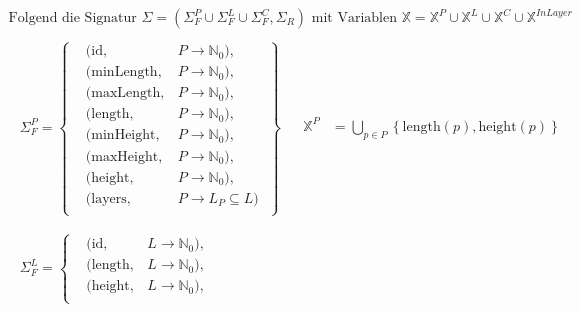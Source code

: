 \[
    \begin{aligned}
        \text{Folgend die Signatur } \Sigma = \left( \Sigma_{F}^{P} \cup \Sigma_{F}^{L} \cup \Sigma_{F}^{C}, \Sigma_{R} \right) \text{ mit Variablen } \mathbb{X} = \mathbb{X}^{P} \cup \mathbb{X}^{L} \cup \mathbb{X}^{C} \cup \mathbb{X}^{InLayer}  \\[5pt]
            \begin{array}{ll}
                \begin{aligned}
                    \Sigma_{F}^{P} = \left\{
                    \begin{aligned}
                        & (\text{id}, & P \rightarrow \mathbb{N}_0), \\
                        & (\text{minLength}, & P \rightarrow \mathbb{N}_0), \\
                        & (\text{maxLength}, & P \rightarrow \mathbb{N}_0), \\
                        & (\text{length}, & P \rightarrow \mathbb{N}_0), \\
                        & (\text{minHeight}, & P \rightarrow \mathbb{N}_0), \\
                        & (\text{maxHeight}, & P \rightarrow \mathbb{N}_0), \\
                        & (\text{height}, & P \rightarrow \mathbb{N}_0), \\
                        & (\text{layers}, & P \rightarrow L_P \subseteq L)\; \\
                    \end{aligned} \right\} \\[5pt]
                \end{aligned}
                &
                \begin{aligned}
                    \mathbb{X}^{P} &= \bigcup_{p \in P} \left\{\text{length}(p), \text{height}(p) \right\} \\
                \end{aligned}
                \\
                \begin{aligned}
                    \Sigma_{F}^{L} = \left\{
                    \begin{aligned}
                        & (\text{id}, & L \rightarrow \mathbb{N}_0), \\
                        & (\text{length}, & L \rightarrow \mathbb{N}_0), \\
                        & (\text{height}, & L \rightarrow \mathbb{N}_0), \\

\end{aligned}
\end{aligned}
\end{array}
\end{aligned}\]
